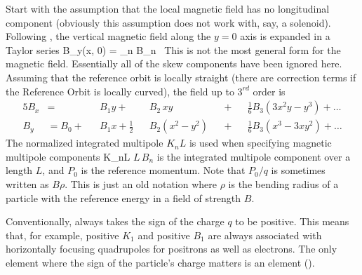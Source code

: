 Start with the assumption that the local magnetic field has no
longitudinal component (obviously this assumption does not work with,
say, a solenoid).  Following \mad, the vertical magnetic field along
the $y = 0$ axis is expanded in a Taylor series
\Begineq
  B_y(x, 0) = \sum_n B_n \, 
  \label{byx0b}
\Endeq
This is not the most
general form for the magnetic field. Essentially all of the skew
components have been ignored here. Assuming that the
reference orbit is locally straight (there are correction terms if the
Reference Orbit is locally curved), the field up to $3^{rd}$ order is
\begin{alignat}{5}
  B_x &=           &&B_1 y \plus         &&B_2 \, xy       
                   && \plus && \frac{1}{6} B_3 (3x^2 y - y^3) \plus \ldots \\
  B_y &= B_0 \plus &&B_1 x + \frac{1}{2} &&B_2 (x^2 - y^2) 
                   && \plus && \frac{1}{6} B_3 (x^3 - 3x y^2) \plus \ldots
\end{alignat}
The normalized integrated multipole $K_nL$ is used when specifying magnetic
multipole components
\Begineq
  K_nL \equiv {}
\Endeq
$L \, B_n$ is the integrated multipole component over a length $L$,
and $P_0$ is the reference momentum. Note that $P_0/q$ is sometimes
written as $B\rho$. This is just an old notation where $\rho$ is the
bending radius of a particle with the reference energy in a field of
strength $B$. 

Conventionally, \bmad always takes the sign of the charge $q$ to be
positive. This means that, for example, positive $K_1$ and positive
$B_1$ are always associated with horizontally focusing quadrupoles for
positrons as well as electrons. The only element where the sign of the
particle's charge matters is an  element ().


